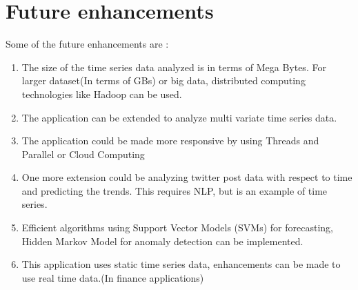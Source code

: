 \documentclass[12pt,a4paper]{report}
\begin{document}
\section{Future enhancements}
Some of the future enhancements are :
\begin{enumerate}
\item{The size of the  time series data analyzed is in terms of Mega Bytes. For larger dataset(In terms of GBs) or big data, distributed computing technologies like Hadoop can be used.}
\item{}The application can be extended to analyze multi variate time series data.
\item{The application could be made more responsive by using Threads and Parallel or Cloud Computing}
\item{One more extension could be analyzing twitter post data with respect to time and predicting the trends. This requires NLP, but is an example of time series.}
\item{Efficient algorithms using Support Vector Models (SVMs) for forecasting, Hidden Markov Model for anomaly detection can be implemented.}
\item{This application uses static time series data, enhancements can be made to use real time data.(In finance applications)}


\end{enumerate}
\end{document}
